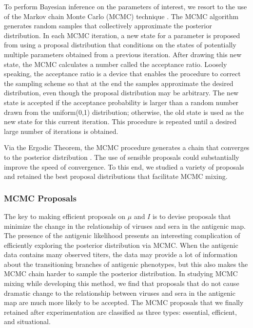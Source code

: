 \documentclass[11pt,oneside,letterpaper]{article}
\begin{document}
To perform Bayesian inference on the parameters of interest, we resort to the use of the Markov chain Monte Carlo (MCMC) technique \cite{hastings_monte_1970, metropolis_equation_1953}.
The MCMC algorithm generates random samples that collectively approximate the posterior distribution.
In each MCMC iteration, a new state for a parameter is proposed from using a proposal distribution that conditions on the states of potentially multiple parameters obtained from a previous iteration.
After drawing this new state, the MCMC calculates a number called the acceptance ratio.
Loosely speaking, the acceptance ratio is a device that enables the procedure to correct the sampling scheme so that at the end the samples approximate the desired distribution, even though the proposal distribution may be arbitrary.
The new state is accepted if the acceptance probability is larger than a random number drawn from the uniform(0,1) distribution; otherwise, the old state is used as the new state for this current iteration.
This procedure is repeated until a desired large number of iterations is obtained.


Via the Ergodic Theorem, the MCMC procedure generates a chain that converges to the posterior distribution \cite{hastings_monte_1970}. %
The use of sensible proposals could substantially improve the speed of convergence.
To this end, we studied a variety of proposals and retained the best proposal distributions that facilitate MCMC mixing.


\subsubsection*{MCMC Proposals}



The key to making efficient proposals on $\mu$ and $I$ is to  devise proposals that minimize the change in the relationship of viruses and sera in the antigenic map.
The presence of the antigenic likelihood presents an interesting complication of efficiently exploring the posterior distribution via MCMC.
When the antigenic data contains many observed titers, the data may provide a lot of information about the transitioning branches of antigenic phenotypes, but this also makes the MCMC chain harder to sample the posterior distribution.
In studying MCMC mixing while developing this method, we find that proposals that do not cause dramatic change to the relationship between viruses and sera in the antigenic map are much more likely to be accepted.
The MCMC proposals that we finally retained after experimentation are classified as three types: essential, efficient, and situational. 
\end{document}
